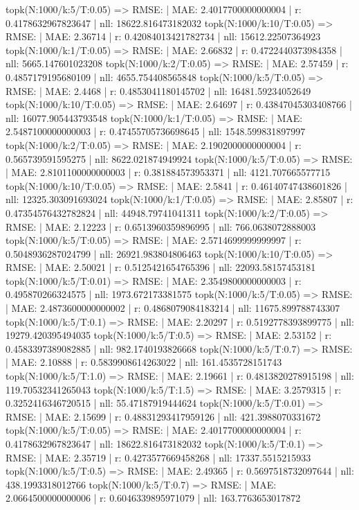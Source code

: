 topk(N:1000/k:5/T:0.05) => RMSE: | MAE: 2.4017700000000004 | r: 0.4178632967823647 | nll: 18622.816473182032
topk(N:1000/k:10/T:0.05) => RMSE: | MAE: 2.36714 | r: 0.42084013421782734 | nll: 15612.22507364923
topk(N:1000/k:1/T:0.05) => RMSE: | MAE: 2.66832 | r: 0.4722440373984358 | nll: 5665.147601023208
topk(N:1000/k:2/T:0.05) => RMSE: | MAE: 2.57459 | r: 0.4857179195680109 | nll: 4655.754408565848
topk(N:1000/k:5/T:0.05) => RMSE: | MAE: 2.4468 | r: 0.4853041180145702 | nll: 16481.59234052649
topk(N:1000/k:10/T:0.05) => RMSE: | MAE: 2.64697 | r: 0.43847045303408766 | nll: 16077.905443793548
topk(N:1000/k:1/T:0.05) => RMSE: | MAE: 2.5487100000000003 | r: 0.47455705736698645 | nll: 1548.599831897997
topk(N:1000/k:2/T:0.05) => RMSE: | MAE: 2.1902000000000004 | r: 0.565739591595275 | nll: 8622.021874949924
topk(N:1000/k:5/T:0.05) => RMSE: | MAE: 2.8101100000000003 | r: 0.381884573953371 | nll: 4121.707665577715
topk(N:1000/k:10/T:0.05) => RMSE: | MAE: 2.5841 | r: 0.46140747438601826 | nll: 12325.303091693024
topk(N:1000/k:1/T:0.05) => RMSE: | MAE: 2.85807 | r: 0.47354576432782824 | nll: 44948.79741041311
topk(N:1000/k:2/T:0.05) => RMSE: | MAE: 2.12223 | r: 0.6513960359896995 | nll: 766.0638072888003
topk(N:1000/k:5/T:0.05) => RMSE: | MAE: 2.5714699999999997 | r: 0.5048936287024799 | nll: 26921.983804806463
topk(N:1000/k:10/T:0.05) => RMSE: | MAE: 2.50021 | r: 0.5125421654765396 | nll: 22093.58157453181
topk(N:1000/k:5/T:0.01) => RMSE: | MAE: 2.3549800000000003 | r: 0.495870266324575 | nll: 1973.672173381575
topk(N:1000/k:5/T:0.05) => RMSE: | MAE: 2.4873600000000002 | r: 0.4868079084183214 | nll: 11675.899788743307
topk(N:1000/k:5/T:0.1) => RMSE: | MAE: 2.20297 | r: 0.5192778393899775 | nll: 19279.420395494035
topk(N:1000/k:5/T:0.5) => RMSE: | MAE: 2.53152 | r: 0.4583397389082885 | nll: 982.1740193826668
topk(N:1000/k:5/T:0.7) => RMSE: | MAE: 2.10888 | r: 0.5839908614263022 | nll: 161.4535728151743
topk(N:1000/k:5/T:1.0) => RMSE: | MAE: 2.19661 | r: 0.4813820278915198 | nll: 119.70532341265043
topk(N:1000/k:5/T:1.5) => RMSE: | MAE: 3.2579315 | r: 0.3252416346720515 | nll: 55.47187919444624
topk(N:1000/k:5/T:0.01) => RMSE: | MAE: 2.15699 | r: 0.48831293417959126 | nll: 421.3988070331672
topk(N:1000/k:5/T:0.05) => RMSE: | MAE: 2.4017700000000004 | r: 0.4178632967823647 | nll: 18622.816473182032
topk(N:1000/k:5/T:0.1) => RMSE: | MAE: 2.35719 | r: 0.4273577669458268 | nll: 17337.5515215933
topk(N:1000/k:5/T:0.5) => RMSE: | MAE: 2.49365 | r: 0.5697518732097644 | nll: 438.1993318012766
topk(N:1000/k:5/T:0.7) => RMSE: | MAE: 2.0664500000000006 | r: 0.6046339895971079 | nll: 163.7763653017872
